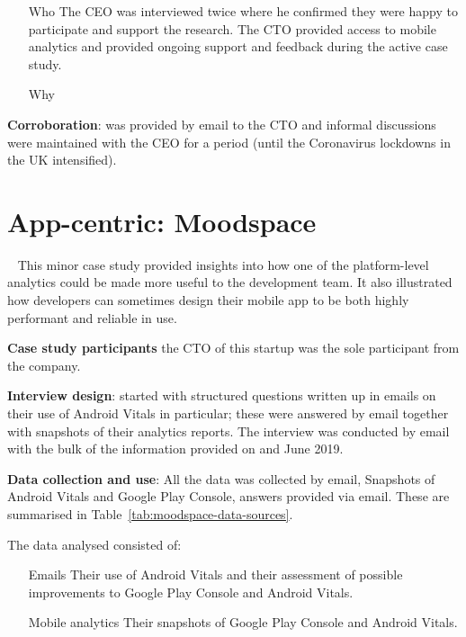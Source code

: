 \begin{itemize}
    \item[Who] The CEO was interviewed twice where he confirmed they were happy to participate and support the research. The CTO provided access to mobile analytics and provided ongoing support and feedback during the active case study. 
    \item[Why]
 

\end{itemize}



\textbf{Corroboration}: was provided by email to the CTO and informal discussions were maintained with the CEO for a period (until the Coronavirus lockdowns in the UK intensified).




\section{App-centric: Moodspace}~\label{case-study-overview-moodspace} 
This minor case study provided insights into how one of the platform-level analytics could be made more useful to the development team. It also illustrated how developers can sometimes design their mobile app to be both highly performant and reliable in use.

\textbf{Case study participants} the CTO of this startup was the sole participant from the company. 

\textbf{Interview design}: started with structured questions written up in emails on their use of Android Vitals in particular; these were answered by email together with snapshots of their analytics reports. The interview was conducted by email with the bulk of the information provided on  and  June 2019.

\textbf{Data collection and use}: All the data was collected by email, Snapshots of Android Vitals and Google Play Console, answers provided via email. These are summarised in Table~\ref{tab:moodspace-data-sources}.

The data analysed consisted of: 
\begin{itemize}
    \item[Emails] Their use of Android Vitals and their assessment of possible improvements to Google Play Console and Android Vitals.
    \item[Mobile analytics] Their snapshots of Google Play Console and Android Vitals.
\end{itemize}

